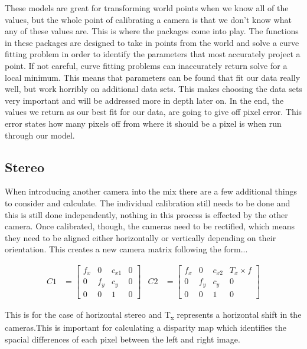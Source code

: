 \documentclass{article}
\begin{document}
These models are great for transforming world points when we know all of the values, but the whole point of calibrating a camera is that we don't know what any of these values are. This is where the packages come into play. The functions in these packages are designed to take in points from the world and solve a curve fitting problem in order to identify the parameters that most accurately project a point. If not careful, curve fitting problems can inaccurately return solve for a local minimum. This means that parameters can be found that fit our data really well, but work horribly on additional data sets. This makes choosing the data sets very important and will be addressed more in depth later on. In the end, the values we return as our best fit for our data, are going to give off pixel error. This error states how many pixels off from where it should be a pixel is when run through our model. 

\subsection{Stereo}

When introducing another camera into the mix there are a few additional things to consider and calculate. The individual calibration still needs to be done and this is still done independently, nothing in this process is effected by the other camera. Once calibrated, though, the cameras need to be rectified, which means they need to be aligned either horizontally or vertically depending on their orientation. This creates a new camera matrix following the form...
	
\begin{align*}
C1 &=
\begin{bmatrix}
f_x & 0 & c_{x1} & 0\\ 0 & f_y & c_y & 0\\ 0 & 0 & 1 & 0
\end{bmatrix} &
C2 &=
\begin{bmatrix}
f_x & 0 & c_{x2} & T_x \times f\\ 0 & f_y & c_y & 0 \\ 0 & 0 & 1 & 0
\end{bmatrix}
\end{align*}

This is for the case of horizontal stereo and T\textsubscript{x} represents a horizontal shift in the cameras.This is important for calculating a disparity map which identifies the spacial differences of each pixel between the left and right image. 
\end{document}
